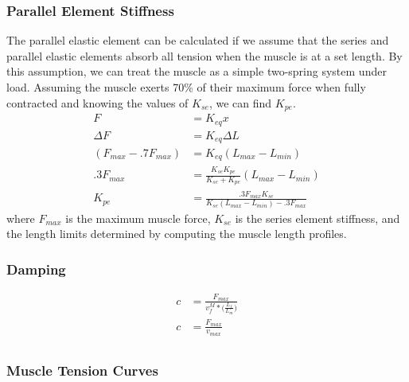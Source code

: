 \documentclass[runningheads,a4paper]{llncs}
\begin{document}
	\subsubsection{Parallel Element Stiffness}
		The parallel elastic element can be calculated if we assume that the series and parallel elastic elements absorb all tension when the muscle is at a set length. By this assumption, we can treat the muscle as a simple two-spring system under load. Assuming the muscle exerts 70\% of their maximum force when fully contracted and knowing the values of $K_{se}$, we can find $K_{pe}$.
			\begin{align*}
				F &= K_{eq} x \\
				\Delta F &= K_{eq} \Delta L \\
				(F_{max} - .7 F_{max}) &= K_{eq} (L_{max}-L_{min}) \\
				.3 F_{max} &= \frac{K_{se}K_{pe}}{K_{se}+K_{pe}} (L_{max}-L_{min}) \\
				K_{pe} &= \frac{.3 F_{max} K_{se}}{K_{se} (L_{max}-L_{min})- .3 F_{max}}
			\end{align*}
		where $F_{max}$ is the maximum muscle force\cite{johnson_application_2011}, $K_{se}$ is the series element stiffness, and the length limits determined by computing the muscle length profiles.
	\subsubsection{Damping}
		\begin{align*}
			c &= \frac{F_{max}}{v_{f}^{M}*\big(\frac{L_{f}}{L_{m}}\big)} \\
			c &= \frac{F_{max}}{v_{max}} \\
		\end{align*}
	\subsubsection{Muscle Tension Curves}
\end{document}
